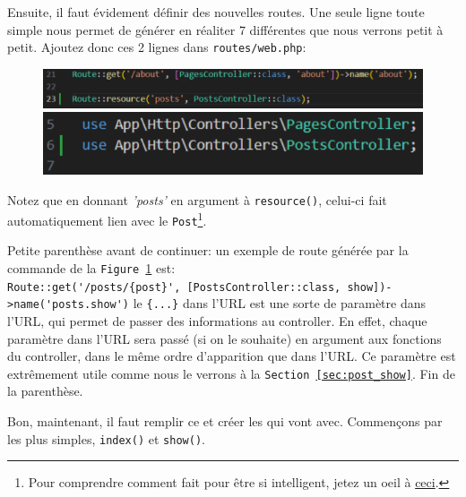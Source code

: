 \documentclass[internal]{nhitec_design}
\begin{document}
Ensuite, il faut évidement définir des nouvelles routes. Une seule ligne toute simple nous permet de générer en réaliter 7 \routes{} différentes que nous verrons petit à petit. Ajoutez donc ces 2 lignes dans \verb|routes/web.php|:

\begin{figure}[!h]
    \centering
    \begin{minipage}{0.6\textwidth}
        \centering
        \includegraphics[width=\textwidth]{figures-C1/res_route_1.pdf}
        \caption{\label{fig:post_route}}
    \end{minipage}
    \begin{minipage}{0.38\textwidth}
        \centering
        \includegraphics[width=\textwidth]{figures-C1/res_route_2.pdf}
        \caption{}
    \end{minipage}
\end{figure}
\vspace{-0.5cm}
Notez que en donnant \textit{'posts'} en argument à \verb|resource()|, celui-ci fait automatiquement lien avec le \model{} \verb|Post|\footnote{Pour comprendre comment \laravel{} fait pour être si intelligent, jetez un oeil à \href{https://laravel.com/docs/10.x/eloquent#table-names}{ceci}.}.

Petite parenthèse avant de continuer: un exemple de route générée par la commande de la \texttt{Figure~\ref{fig:post_route}} est: \\
\verb|Route::get('/posts/{post}', [PostsController::class, show])->name('posts.show')|
le \verb|{...}| dans l'URL est une sorte de paramètre dans l'URL, qui permet de passer des informations au controller. En effet, chaque paramètre dans l'URL sera passé (si on le souhaite) en argument aux fonctions du controller, dans le même ordre d'apparition que dans l'URL. Ce paramètre est extrêmement utile comme nous le verrons à la \texttt{Section~\ref{sec:post_show}}. Fin de la parenthèse.

Bon, maintenant, il faut remplir ce \controller{} et créer les \views{} qui vont avec. Commençons par les plus simples, \verb|index()| et \verb|show()|.
\end{document}
